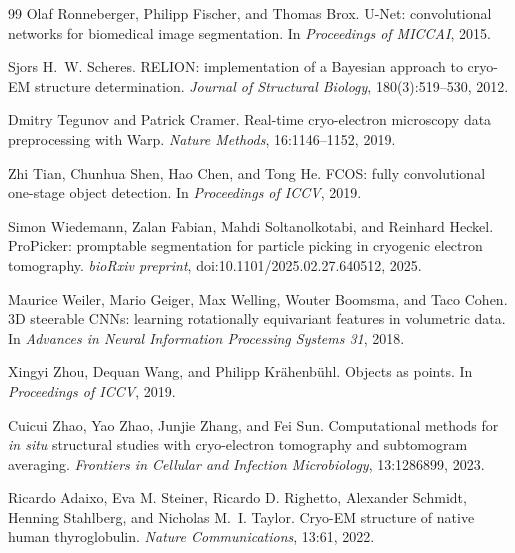 \documentclass[12pt,a4paper]{report}
\begin{document}
\begin{thebibliography}{99}
Olaf Ronneberger, Philipp Fischer, and Thomas Brox.
\newblock U-Net: convolutional networks for biomedical image segmentation.
\newblock In \emph{Proceedings of MICCAI}, 2015.

Sjors H.~W. Scheres.
\newblock RELION: implementation of a Bayesian approach to cryo-EM structure determination.
\newblock \emph{Journal of Structural Biology}, 180(3):519--530, 2012.

Dmitry Tegunov and Patrick Cramer.
\newblock Real-time cryo-electron microscopy data preprocessing with Warp.
\newblock \emph{Nature Methods}, 16:1146--1152, 2019.

Zhi Tian, Chunhua Shen, Hao Chen, and Tong He.
\newblock FCOS: fully convolutional one-stage object detection.
\newblock In \emph{Proceedings of ICCV}, 2019.

Simon Wiedemann, Zalan Fabian, Mahdi Soltanolkotabi, and Reinhard Heckel.
\newblock ProPicker: promptable segmentation for particle picking in cryogenic electron tomography.
\newblock \emph{bioRxiv preprint}, doi:10.1101/2025.02.27.640512, 2025.

Maurice Weiler, Mario Geiger, Max Welling, Wouter Boomsma, and Taco Cohen.
\newblock 3D steerable CNNs: learning rotationally equivariant features in volumetric data.
\newblock In \emph{Advances in Neural Information Processing Systems 31}, 2018.

Xingyi Zhou, Dequan Wang, and Philipp Kr\"ahenb\"uhl.
\newblock Objects as points.
\newblock In \emph{Proceedings of ICCV}, 2019.

Cuicui Zhao, Yao Zhao, Junjie Zhang, and Fei Sun.
\newblock Computational methods for \emph{in situ} structural studies with cryo-electron tomography and subtomogram averaging.
\newblock \emph{Frontiers in Cellular and Infection Microbiology}, 13:1286899, 2023.

Ricardo Adaixo, Eva M. Steiner, Ricardo D. Righetto, Alexander Schmidt, Henning Stahlberg, and Nicholas M.~I. Taylor.
\newblock Cryo-EM structure of native human thyroglobulin.
\newblock \emph{Nature Communications}, 13:61, 2022.

\end{thebibliography}

\appendix
\end{document}
